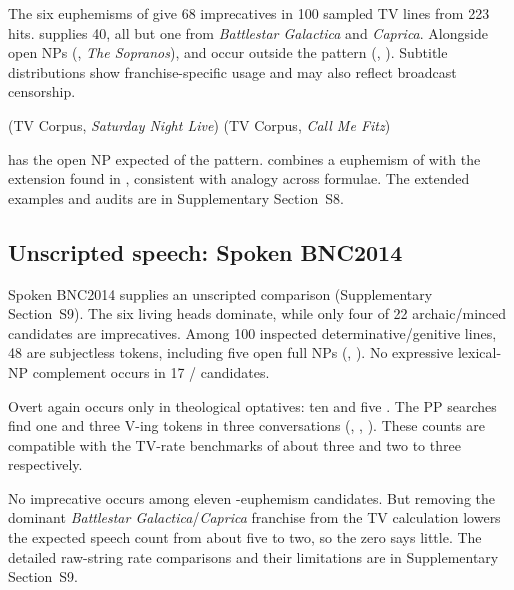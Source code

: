 \documentclass[12pt]{article}
\begin{document}
The six euphemisms of  give 68 imprecatives in 100 sampled TV lines from 223 hits.  supplies 40, all but one from \emph{Battlestar Galactica} and \emph{Caprica}. Alongside open NPs (, \emph{The Sopranos}),  and  occur outside the pattern (, ). Subtitle distributions show franchise-specific usage and may also reflect broadcast censorship.

\ea\label{ex:f3-examples}
\ea {} \hfill (TV Corpus, \emph{Saturday Night Live})
\ex {} \hfill (TV Corpus, \emph{Call Me Fitz})
\z
\z

 has the open NP expected of the pattern.  combines a euphemism of  with the extension found in , consistent with analogy across formulae. The extended examples and audits are in Supplementary Section~S8.

\subsection{Unscripted speech: Spoken BNC2014}
\label{sec:bnc2014}

Spoken BNC2014 supplies an unscripted comparison (Supplementary Section~S9). The six living heads dominate, while only four of 22 archaic/minced candidates are imprecatives. Among 100 inspected determinative/genitive lines, 48 are subjectless tokens, including five open full NPs (, ). No expressive lexical-NP complement occurs in 17 / candidates.

Overt  again occurs only in theological optatives: ten  and five . The PP searches find one  and three  V-ing tokens in three conversations (, , ). These counts are compatible with the TV-rate benchmarks of about three and two to three respectively.

No imprecative occurs among eleven -euphemism candidates. But removing the dominant \emph{Battlestar Galactica}/\emph{Caprica} franchise from the TV calculation lowers the expected speech count from about five to two, so the zero says little. The detailed raw-string rate comparisons and their limitations are in Supplementary Section~S9.
\end{document}
